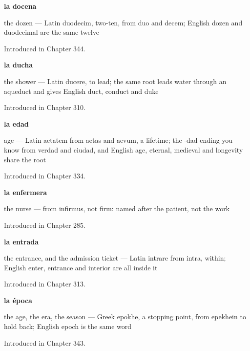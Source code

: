 \noindent\begin{minipage}[t]{\linewidth}
\raggedright
\textbf{la docena}\par
\small the dozen — Latin duodecim, two-ten, from duo and decem; English dozen and duodecimal are the same twelve\par
\footnotesize Introduced in Chapter 344.
\end{minipage}\par\medskip

\noindent\begin{minipage}[t]{\linewidth}
\raggedright
\textbf{la ducha}\par
\small the shower — Latin ducere, to lead; the same root leads water through an aqueduct and gives English duct, conduct and duke\par
\footnotesize Introduced in Chapter 310.
\end{minipage}\par\medskip

\noindent\begin{minipage}[t]{\linewidth}
\raggedright
\textbf{la edad}\par
\small age — Latin aetatem from aetas and aevum, a lifetime; the -dad ending you know from verdad and ciudad, and English age, eternal, medieval and longevity share the root\par
\footnotesize Introduced in Chapter 334.
\end{minipage}\par\medskip

\noindent\begin{minipage}[t]{\linewidth}
\raggedright
\textbf{la enfermera}\par
\small the nurse — from infirmus, not firm: named after the patient, not the work\par
\footnotesize Introduced in Chapter 285.
\end{minipage}\par\medskip

\noindent\begin{minipage}[t]{\linewidth}
\raggedright
\textbf{la entrada}\par
\small the entrance, and the admission ticket — Latin intrare from intra, within; English enter, entrance and interior are all inside it\par
\footnotesize Introduced in Chapter 313.
\end{minipage}\par\medskip

\noindent\begin{minipage}[t]{\linewidth}
\raggedright
\textbf{la época}\par
\small the age, the era, the season — Greek epokhe, a stopping point, from epekhein to hold back; English epoch is the same word\par
\footnotesize Introduced in Chapter 343.
\end{minipage}\par\medskip

